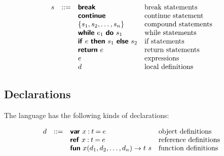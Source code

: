 \documentclass[11pt]{article}
\newcommand{\mathsc}[1]{\bm{\mathsf{#1}}}
\newcommand{\typebool}{\ensuremath{\mathsc{bool}}\xspace}
\newcommand{\exprtrue}{\mathsc{true}}
\newcommand{\exprfalse}{\mathsc{false}}
\newcommand{\stmtbreak}{\ensuremath{\mathsc{break}}\xspace}
\newcommand{\stmtcont}{\ensuremath{\mathsc{continue}}\xspace}
\newcommand{\stmtblock}[1]{\ensuremath{\{#1\}}\xspace}
\newcommand{\stmtwhile}[2]{\ensuremath{%
  \mathsc{while}~#1~\mathsc{do}~#2%
  }\xspace}
\newcommand{\stmtif}[3]{\ensuremath{%
  \mathsc{if}~#1~\mathsc{then}~#2~\mathsc{else}~#3%
  }\xspace}
\newcommand{\stmtret}[1]{\ensuremath{%
  \mathsc{return}~#1%
  }\xspace}
\newcommand{\stmtexpr}[1]{\ensuremath{#1}\xspace}
\newcommand{\stmtdecl}[1]{\ensuremath{#1}\xspace}
\newcommand{\decllet}[4]{\ensuremath{%
  \mathsc{#1}~#2\mathbin{:}#3\mathbin{=}#4%
  }\xspace}
\newcommand{\declvar}[3]{\decllet{var}{#1}{#2}{#3}}
\newcommand{\declref}[3]{\decllet{ref}{#1}{#2}{#3}}
\newcommand{\declfn}[4]{\ensuremath{%
  \mathsc{fun}~#1(#2) \rightarrow #3~#4%
  }\xspace}
\begin{document}
\[
\begin{array}{lcll}
s &::=& \stmtbreak              & \text{break statements} \\
  &   & \stmtcont               & \text{continue statement} \\
  &   & \stmtblock{s_1, s_2, \ldots, s_n}
                                & \text{compound statements} \\
  &   & \stmtwhile{e_1}{s_1}    & \text{while statements} \\
  &   & \stmtif{e}{s_1}{s_2}    & \text{if statements} \\
  &   & \stmtret{e}             & \text{return statements} \\
  &   & \stmtexpr{e}            & \text{expressions} \\
  &   & \stmtdecl{d}            & \text{local definitions} \\
\end{array}
\]

\subsection{Declarations}

The language has the following kinds of declarations:

\[
\begin{array}{lcll}
d &::=& \declvar{x}{t}{e}       & \text{object definitions} \\
  &   & \declref{x}{t}{e}       & \text{reference definitions} \\
  &   & \declfn{x}{d_1, d_2, \ldots, d_n}{t}{s}
                                & \text{function definitions} \\
\end{array}
\]





\end{document}
